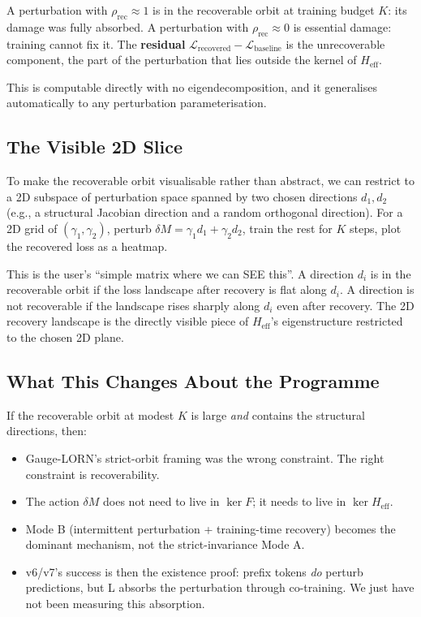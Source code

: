 \documentclass[11pt, a4paper]{article}
\theoremstyle{plain}
\theoremstyle{definition}
\theoremstyle{remark}
\begin{document}
A perturbation with $\rho_{\text{rec}} \approx 1$ is in the recoverable orbit at training budget $K$: its damage was fully absorbed.
A perturbation with $\rho_{\text{rec}} \approx 0$ is essential damage: training cannot fix it.
The \textbf{residual} $\mathcal{L}_{\text{recovered}} - \mathcal{L}_{\text{baseline}}$ is the unrecoverable component, the part of the perturbation that lies outside the kernel of $H_{\text{eff}}$.

This is computable directly with no eigendecomposition, and it generalises automatically to any perturbation parameterisation.

\subsection{The Visible 2D Slice}

To make the recoverable orbit visualisable rather than abstract, we can restrict to a 2D subspace of perturbation space spanned by two chosen directions $d_1, d_2$ (e.g., a structural Jacobian direction and a random orthogonal direction).
For a 2D grid of $(\gamma_1, \gamma_2)$, perturb $\delta M = \gamma_1 d_1 + \gamma_2 d_2$, train the rest for $K$ steps, plot the recovered loss as a heatmap.

This is the user's ``simple matrix where we can SEE this''.
A direction $d_i$ is in the recoverable orbit if the loss landscape after recovery is flat along $d_i$.
A direction is not recoverable if the landscape rises sharply along $d_i$ even after recovery.
The 2D recovery landscape is the directly visible piece of $H_{\text{eff}}$'s eigenstructure restricted to the chosen 2D plane.

\subsection{What This Changes About the Programme}

If the recoverable orbit at modest $K$ is large \emph{and} contains the structural directions, then:
\begin{itemize}[nosep]
\item Gauge-LORN's strict-orbit framing was the wrong constraint. The right constraint is recoverability.
\item The action $\delta M$ does not need to live in $\ker F$; it needs to live in $\ker H_{\text{eff}}$.
\item Mode B (intermittent perturbation + training-time recovery) becomes the dominant mechanism, not the strict-invariance Mode A.
\item v6/v7's success is then the existence proof: prefix tokens \emph{do} perturb predictions, but L absorbs the perturbation through co-training. We just have not been measuring this absorption.
\end{itemize}
\end{document}
